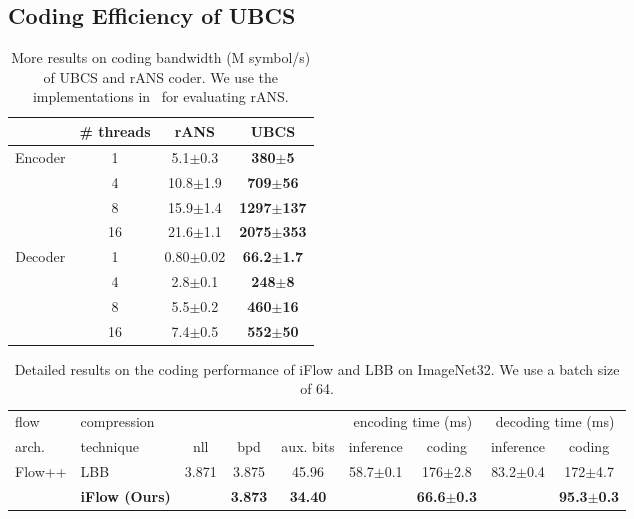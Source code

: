 \documentclass{article}
\newcommand{\ebar}[1]{{\tiny $\pm$#1}}
\begin{document}
\subsection{Coding Efficiency of UBCS}

\begin{table}[t]
\centering
\small
\caption{More results on coding bandwidth (M symbol/s) of UBCS and rANS coder. We use the implementations in~\cite{ho2019compression} for evaluating rANS.}
\label{tab:more_coders}
\begin{tabular}{cccc}
\toprule
 & \# threads & rANS & \textbf{UBCS} \\
\midrule
\multirow{4}{*}{Encoder} & 1 & 5.1\ebar{0.3} & \bf 380\ebar{5} \\
 & 4 & 10.8\ebar{1.9} & \bf 709\ebar{56} \\
 & 8 & 15.9\ebar{1.4} & \bf 1297\ebar{137} \\
 & 16 & 21.6\ebar{1.1} & \bf 2075\ebar{353} \\
\midrule
\multirow{4}{*}{Decoder} & 1 & 0.80\ebar{0.02} & \bf 66.2\ebar{1.7} \\
 & 4 & 2.8\ebar{0.1} & \bf 248\ebar{8} \\
 & 8 & 5.5\ebar{0.2} & \bf 460\ebar{16} \\
 & 16 & 7.4\ebar{0.5} & \bf 552\ebar{50} \\
\bottomrule
\end{tabular}
\end{table} 



\begin{table}[h]
\centering
\small
\caption{Detailed results on the coding performance of iFlow and LBB on ImageNet32. We use a batch size of 64.}
\label{tab:baselines_img32}
\begin{tabular}{llccccccc}
\toprule
flow & compression & & & & \multicolumn{2}{c}{encoding time (ms)} & \multicolumn{2}{c}{decoding time (ms)}\\
arch. & technique & nll & bpd & aux. bits & inference & coding &  inference & coding \\
\midrule
\multirow{2}{*}{Flow++} & LBB~\cite{ho2019compression} & \multirow{2}{*}{3.871} & 3.875 & 45.96 & \multirow{2}{*}{58.7\ebar{0.1}} & 176\ebar{2.8} & \multirow{2}{*}{83.2\ebar{0.4}} & 172\ebar{4.7} \\
 & \textbf{iFlow (Ours)} & & \textbf{3.873} & \textbf{34.40} & & \textbf{66.6\ebar{0.3}} & & \textbf{95.3\ebar{0.3}} \\
\bottomrule
\end{tabular}
\end{table}
\end{document}
